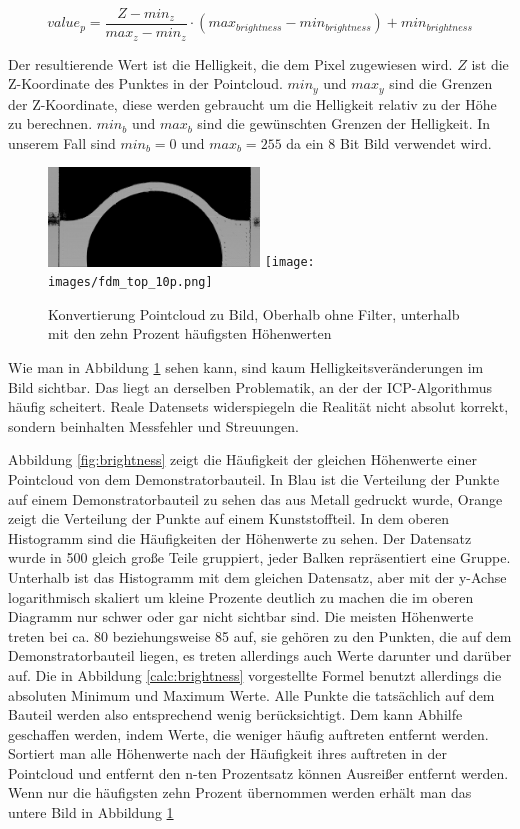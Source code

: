 \begin{equation*}
    value_p = \frac{Z - min_z}{max_z - min_z} \cdot (max_{brightness} - min_{brightness}) + min_{brightness}
\end{equation*}

Der resultierende Wert ist die Helligkeit, die dem Pixel zugewiesen wird.
$Z$ ist die Z-Koordinate des Punktes in der Pointcloud. $min_y$ und $max_y$ sind 
die Grenzen der Z-Koordinate, diese werden gebraucht um die Helligkeit relativ 
zu der Höhe zu berechnen. $min_b$ und $max_b$ sind die gewünschten Grenzen der 
Helligkeit. In unserem Fall sind $min_b = 0$ und $max_b = 255$ da ein 8 Bit Bild
verwendet wird.

\begin{figure}[h]
    \centering
    \includegraphics[width=0.5\textwidth]{images/fdm_top_100p.png}
    \texttt{[image: images/fdm\_top\_10p.png]}
    \caption{Konvertierung Pointcloud zu Bild, Oberhalb ohne Filter, unterhalb 
    mit den zehn Prozent häufigsten Höhenwerten}
    \label{fig:image_from_pc}
\end{figure}

Wie man in Abbildung \ref{fig:image_from_pc} sehen kann, sind kaum Helligkeitsveränderungen
im Bild sichtbar. Das liegt an derselben Problematik, an der der ICP-Algorithmus häufig
scheitert. Reale Datensets widerspiegeln die Realität nicht absolut korrekt, sondern
beinhalten Messfehler und Streuungen.

Abbildung \ref*{fig:brightness} zeigt die Häufigkeit der gleichen Höhenwerte einer
Pointcloud von dem Demonstratorbauteil. In Blau ist die Verteilung der Punkte auf 
einem Demonstratorbauteil zu sehen das aus Metall gedruckt wurde, Orange zeigt die 
Verteilung der Punkte auf einem Kunststoffteil.
In dem oberen Histogramm 
sind die Häufigkeiten der Höhenwerte zu sehen. Der Datensatz wurde in 500 gleich große
Teile gruppiert, jeder Balken repräsentiert eine Gruppe.
Unterhalb ist das Histogramm mit dem gleichen Datensatz, aber mit der y-Achse 
logarithmisch skaliert um kleine Prozente deutlich zu machen die im
oberen Diagramm nur schwer oder gar nicht sichtbar sind. 
Die meisten Höhenwerte treten bei ca. 80 beziehungsweise 85 auf, 
sie gehören zu den Punkten, die auf dem Demonstratorbauteil liegen, 
es treten allerdings auch Werte darunter und darüber auf. 
Die in Abbildung \ref*{calc:brightness} vorgestellte Formel benutzt allerdings 
die absoluten Minimum und Maximum Werte.
Alle Punkte die tatsächlich auf dem Bauteil werden also entsprechend wenig
berücksichtigt. Dem kann Abhilfe geschaffen werden, indem Werte, die weniger häufig 
auftreten entfernt werden. Sortiert man alle Höhenwerte nach der Häufigkeit ihres 
auftreten in der Pointcloud und entfernt den n-ten Prozentsatz können Ausreißer 
entfernt werden. Wenn nur die häufigsten zehn Prozent übernommen werden erhält man 
das untere Bild in Abbildung \ref{fig:image_from_pc}

